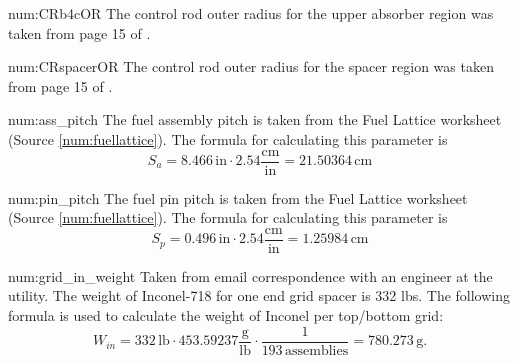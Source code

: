 \begin{numitem}{num:CRb4cOR}
  The control rod outer radius for the upper absorber region was taken from page
  15 of \cite{ml033530020}.
  
\end{numitem}

\begin{numitem}{num:CRspacerOR}
  The control rod outer radius for the spacer region was taken from page
  15 of \cite{ml033530020}.
  
\end{numitem}

\begin{numitem}{num:ass_pitch}
  The fuel assembly pitch is taken from the Fuel Lattice worksheet (Source \ref{num:fuellattice}). The formula for calculating this parameter is
\[
    S_a = 8.466\,\mathrm{in}\cdot 2.54\mathrm{\frac{cm}{in}} = 21.50364 \,\mathrm{cm}
\]
\end{numitem}

\begin{numitem}{num:pin_pitch}
  The fuel pin pitch is taken from the Fuel Lattice worksheet (Source \ref{num:fuellattice}). The formula for calculating this parameter is
\[
    S_p = 0.496\,\mathrm{in}\cdot 2.54\mathrm{\frac{cm}{in}} = 1.25984 \,\mathrm{cm}
\]
\end{numitem}

\begin{numitem}{num:grid_in_weight}
  Taken from email correspondence with an engineer at the utility. The weight of
  Inconel-718 for one end grid spacer is 332 lbs. The following formula is used
  to calculate the weight of Inconel per top/bottom grid:
\[
    W_{in} = 332\,\mathrm{lb} \cdot 453.59237\mathrm{\frac{g}{lb}} \cdot \frac{1}{193\,\mathrm{assemblies}} = 780.273\,\mathrm{g}.
\]
\end{numitem}

